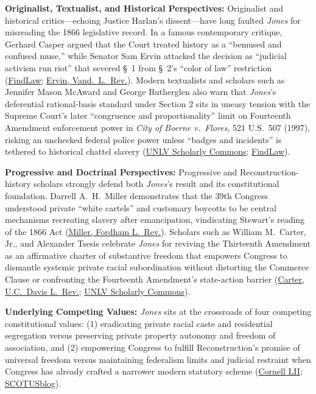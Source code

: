 \documentclass[12pt]{article}
\begin{document}
\textbf{Originalist, Textualist, and Historical Perspectives:} Originalist and historical critics---echoing Justice Harlan's dissent---have long faulted \textit{Jones} for misreading the 1866 legislative record. In a famous contemporary critique, Gerhard Casper argued that the Court treated history as a ``bemused and confused muse,'' while Senator Sam Ervin attacked the decision as ``judicial activism run riot'' that severed \S~1 from \S~2's ``color of law'' restriction (\href{https://caselaw.findlaw.com/court/us-10th-circuit/1637502.html}{FindLaw}; \href{https://scholarship.law.vanderbilt.edu/cgi/viewcontent.cgi?article=3460&context=vlr}{Ervin, Vand.\ L.\ Rev.}). Modern textualists and scholars such as Jennifer Mason McAward and George Rutherglen also warn that \textit{Jones}'s deferential rational-basis standard under Section 2 sits in uneasy tension with the Supreme Court's later ``congruence and proportionality'' limit on Fourteenth Amendment enforcement power in \textit{City of Boerne v.\ Flores}, 521 U.S.\ 507 (1997), risking an unchecked federal police power unless ``badges and incidents'' is tethered to historical chattel slavery (\href{https://scholars.law.unlv.edu/cgi/viewcontent.cgi?article=1013&context=amend13_bi}{UNLV Scholarly Commons}; \href{https://caselaw.findlaw.com/court/us-10th-circuit/1637502.html}{FindLaw}).

\textbf{Progressive and Doctrinal Perspectives:} Progressive and Reconstruction-history scholars strongly defend both \textit{Jones}'s result and its constitutional foundation. Darrell A.\ H.\ Miller demonstrates that the 39th Congress understood private ``white cartels'' and customary boycotts to be central mechanisms recreating slavery after emancipation, vindicating Stewart's reading of the 1866 Act (\href{https://scholarship.law.duke.edu/cgi/viewcontent.cgi?article=5768&context=faculty_scholarship}{Miller, Fordham L.\ Rev.}). Scholars such as William M.\ Carter, Jr., and Alexander Tsesis celebrate \textit{Jones} for reviving the Thirteenth Amendment as an affirmative charter of substantive freedom that empowers Congress to dismantle systemic private racial subordination without distorting the Commerce Clause or confronting the Fourteenth Amendment's state-action barrier (\href{https://lawreview.law.ucdavis.edu/sites/g/files/dgvnsk15026/files/media/documents/DavisVol40No4_Carter.pdf}{Carter, U.C.\ Davis L.\ Rev.}; \href{https://scholars.law.unlv.edu/cgi/viewcontent.cgi?article=1013&context=amend13_bi}{UNLV Scholarly Commons}).

\textbf{Underlying Competing Values:} \textit{Jones} sits at the crossroads of four competing constitutional values: (1) eradicating private racial caste and residential segregation versus preserving private property autonomy and freedom of association, and (2) empowering Congress to fulfill Reconstruction's promise of universal freedom versus maintaining federalism limits and judicial restraint when Congress has already crafted a narrower modern statutory scheme (\href{https://www.law.cornell.edu/constitution-conan/amendment-13/scope-of-enforcement-clause-of-thirteenth-amendment}{Cornell LII}; \href{https://www.scotusblog.com/2010/02/jones-v-alfred-mayer-and-the-uniqueness-of-race/}{SCOTUSblog}).
\end{document}
